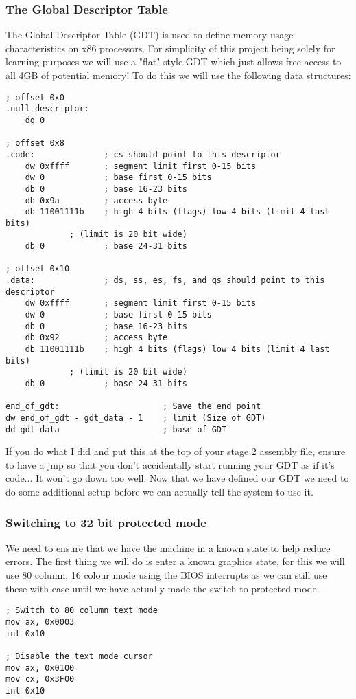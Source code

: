 \documentclass[10pt,a4paper]{article}
\begin{document}
\subsubsection{The Global Descriptor Table}
The Global Descriptor Table (GDT) is used to define memory usage characteristics on x86 processors. For simplicity of this project being solely for learning purposes we will use a "flat" style GDT which just allows free access to all 4GB of potential memory! To do this we will use the following data structures:
\begin{verbatim}
; offset 0x0
.null descriptor:
	dq 0

; offset 0x8
.code:				; cs should point to this descriptor
	dw 0xffff		; segment limit first 0-15 bits
	dw 0			; base first 0-15 bits
	db 0			; base 16-23 bits
	db 0x9a			; access byte
	db 11001111b	; high 4 bits (flags) low 4 bits (limit 4 last bits)
             ; (limit is 20 bit wide)
	db 0			; base 24-31 bits

; offset 0x10
.data:				; ds, ss, es, fs, and gs should point to this descriptor
	dw 0xffff		; segment limit first 0-15 bits
	dw 0			; base first 0-15 bits
	db 0			; base 16-23 bits
	db 0x92			; access byte
	db 11001111b	; high 4 bits (flags) low 4 bits (limit 4 last bits)
             ; (limit is 20 bit wide)
	db 0			; base 24-31 bits
	
end_of_gdt:                     ; Save the end point
dw end_of_gdt - gdt_data - 1    ; limit (Size of GDT)
dd gdt_data                     ; base of GDT
\end{verbatim}

If you do what I did and put this at the top of your stage 2 assembly file, ensure to have a jmp so that you don't accidentally start running your GDT as if it's code... It won't go down too well. Now that we have defined our GDT we need to do some additional setup before we can actually tell the system to use it.

\newpage
\subsubsection{Switching to 32 bit protected mode}
We need to ensure that we have the machine in a known state to help reduce errors. The first thing we will do is enter a known graphics state, for this we will use 80 column, 16 colour mode using the BIOS interrupts as we can still use these with ease until we have actually made the switch to protected mode.
\begin{verbatim}
; Switch to 80 column text mode
mov ax, 0x0003
int 0x10

; Disable the text mode cursor
mov ax, 0x0100
mov cx, 0x3F00
int 0x10
\end{verbatim}
\end{document}
